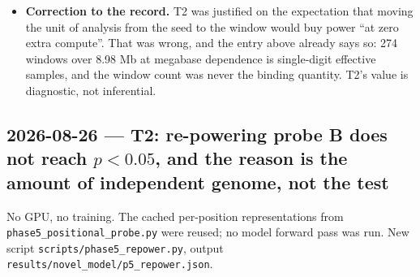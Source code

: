 \documentclass[11pt,a4paper]{article}
\newcommand{\code}[1]{\texttt{\small #1}}
\begin{document}
\begin{itemize}
The width narrows with $L$ again, so only the $\geq 20$-block rows are usable.
At the largest reliable setting ($L=8$, 35 blocks) $p = 0.0230$, CI
$[+0.0190, +0.2192]$. \textbf{Unlike the pooled-$r$ difference, $\rho$'s CI
excludes zero at every block length tested, including the reliable ones}, so
this does not rest on the 9-block artefact.

\textbf{Read it carefully.} Mean $d_w$ is \emph{not} monotone --- Q2 is the
largest, not Q4 --- so this is not a clean dose-response. What \emph{is}
monotone is the fraction of windows the structural arm wins:
$0.420 \to 0.500 \to 0.559 \to 0.580$. And Q1 is \textbf{negative}: where
$\varphi$ barely varies within the window, the structural arm is worse. Caveat
on that: in Q1 the centred target is close to pure noise, so a per-window $r$
there estimates almost nothing and its sign is weakly determined.

\textbf{Status: a strong lead, not an established result.} The $0.262$ Mb
blocks that make the bootstrap reliable are shorter than Hi-C autocorrelation,
so $p = 0.0230$ is anticonservative, and 8.98 Mb cannot do better. The
multi-chromosome build should confirm or kill it. If it holds, it converts
keep($\varphi$) from a post-hoc account of a null into a prediction that was
made and tested --- a materially better paper than either the null or the
probe-B positive alone.

\item \textbf{Correction to the record.} T2 was justified on the expectation
that moving the unit of analysis from the seed to the window would buy power
``at zero extra compute''. That was wrong, and the entry above already says so:
274 windows over 8.98 Mb at megabase dependence is single-digit effective
samples, and the window count was never the binding quantity. T2's value is
diagnostic, not inferential.

\end{itemize}
\subsection*{2026-08-26 --- T2: re-powering probe B does not reach $p<0.05$, and
the reason is the amount of independent genome, not the test}

No GPU, no training. The cached per-position representations from
\code{phase5\_positional\_probe.py} were reused; no model forward pass was run.
New script \code{scripts/phase5\_repower.py}, output
\code{results/novel\_model/p5\_repower.json}.
\end{document}
